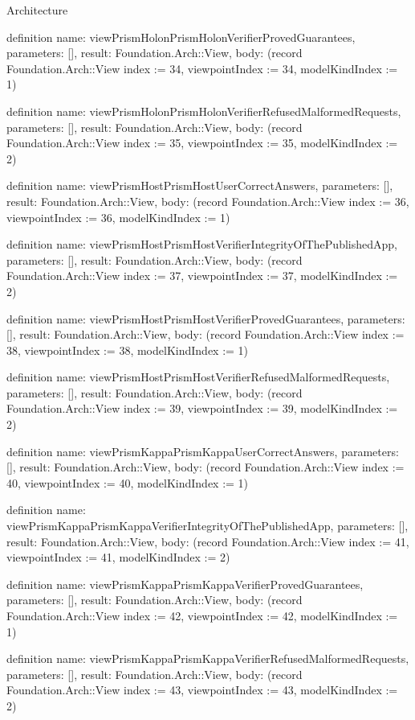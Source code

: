 \begin{lexlean}{Architecture}
\begin{semanticmodule}
definition{
  name: viewPrismHolonPrismHolonVerifierProvedGuarantees,
  parameters: [],
  result: Foundation.Arch::View,
  body: (record Foundation.Arch::View {index := 34, viewpointIndex := 34, modelKindIndex := 1})
}

definition{
  name: viewPrismHolonPrismHolonVerifierRefusedMalformedRequests,
  parameters: [],
  result: Foundation.Arch::View,
  body: (record Foundation.Arch::View {index := 35, viewpointIndex := 35, modelKindIndex := 2})
}

definition{
  name: viewPrismHostPrismHostUserCorrectAnswers,
  parameters: [],
  result: Foundation.Arch::View,
  body: (record Foundation.Arch::View {index := 36, viewpointIndex := 36, modelKindIndex := 1})
}

definition{
  name: viewPrismHostPrismHostVerifierIntegrityOfThePublishedApp,
  parameters: [],
  result: Foundation.Arch::View,
  body: (record Foundation.Arch::View {index := 37, viewpointIndex := 37, modelKindIndex := 2})
}

definition{
  name: viewPrismHostPrismHostVerifierProvedGuarantees,
  parameters: [],
  result: Foundation.Arch::View,
  body: (record Foundation.Arch::View {index := 38, viewpointIndex := 38, modelKindIndex := 1})
}

definition{
  name: viewPrismHostPrismHostVerifierRefusedMalformedRequests,
  parameters: [],
  result: Foundation.Arch::View,
  body: (record Foundation.Arch::View {index := 39, viewpointIndex := 39, modelKindIndex := 2})
}

definition{
  name: viewPrismKappaPrismKappaUserCorrectAnswers,
  parameters: [],
  result: Foundation.Arch::View,
  body: (record Foundation.Arch::View {index := 40, viewpointIndex := 40, modelKindIndex := 1})
}

definition{
  name: viewPrismKappaPrismKappaVerifierIntegrityOfThePublishedApp,
  parameters: [],
  result: Foundation.Arch::View,
  body: (record Foundation.Arch::View {index := 41, viewpointIndex := 41, modelKindIndex := 2})
}

definition{
  name: viewPrismKappaPrismKappaVerifierProvedGuarantees,
  parameters: [],
  result: Foundation.Arch::View,
  body: (record Foundation.Arch::View {index := 42, viewpointIndex := 42, modelKindIndex := 1})
}

definition{
  name: viewPrismKappaPrismKappaVerifierRefusedMalformedRequests,
  parameters: [],
  result: Foundation.Arch::View,
  body: (record Foundation.Arch::View {index := 43, viewpointIndex := 43, modelKindIndex := 2})
}


\end{semanticmodule}
\end{lexlean}
